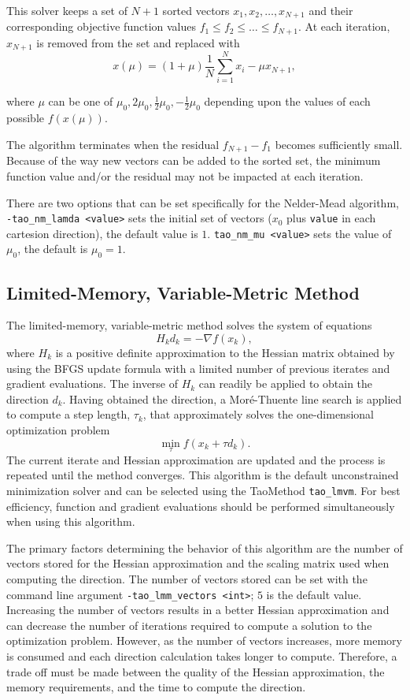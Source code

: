 This solver keeps a set of $N+1$ sorted vectors ${x_1,x_2,\ldots,x_{N+1}}$ and their corresponding 
objective function values $f_1 \leq f_2 \leq \ldots \leq f_{N+1}$.  At each iteration, $x_{N+1}$ is removed from
the set and replaced with 
\[
x(\mu) = (1+\mu) \frac{1}{N} \sum_{i=1}^N x_i - \mu x_{N+1},
\]  
 
where $\mu$ can be one of ${\mu_0,2\mu_0,\frac{1}{2}\mu_0,-\frac{1}{2}\mu_0}$ depending upon the values of 
each possible $f(x(\mu))$.

The algorithm terminates when the residual  $f_{N+1} - f_1$ becomes sufficiently small.  Because of 
the way new vectors can be added to the sorted set, 
the minimum function value and/or the residual may not be impacted at each iteration.

There are two options that can be set specifically for the Nelder-Mead algorithm,
{\tt -tao\_nm\_lamda <value>} sets the initial set of vectors ($x_0$ plus 
{\tt value} in each cartesion direction), the default value is $1$.  
{\tt tao\_nm\_mu <value>} sets the value of $\mu_0$, 
the default is $\mu_0=1$.


\subsection{Limited-Memory, Variable-Metric Method}

The limited-memory, variable-metric method solves the system of equations
\[
H_k d_k = -\nabla f(x_k),
\]
where $H_k$ is a positive definite approximation to the Hessian matrix 
obtained by using the BFGS update formula with a limited number of 
previous iterates and gradient evaluations.  The inverse of $H_k$ can 
readily be applied to obtain the direction $d_k$.  Having obtained the 
direction, a Mor\'{e}-Thuente line search is applied to compute a step
length, $\tau_k$, that approximately solves the one-dimensional 
optimization problem
\[
\min_\tau f(x_k + \tau d_k).
\]
The current iterate and Hessian approximation are updated and the process
is repeated until the method converges.  This algorithm is the default 
unconstrained minimization solver and can be selected using the 
TaoMethod {\tt tao\_lmvm}.  For best efficiency, function and gradient 
evaluations should be performed simultaneously when using this algorithm.

The primary factors determining the behavior of this algorithm are the 
number of vectors stored for the Hessian approximation and the scaling matrix
used when computing the direction.  The number of vectors stored can be set
with the command line argument {\tt -tao\_lmm\_vectors <int>}; $5$ is the 
default 
value.  Increasing the number of vectors results in a better Hessian 
approximation and can decrease the number of iterations required to compute
a solution to the optimization problem.  However, as the number of vectors
increases, more memory is consumed and each direction calculation takes
longer to compute.  Therefore, a trade off must be made between the 
quality of the Hessian approximation, the memory requirements, and
the time to compute the direction.

